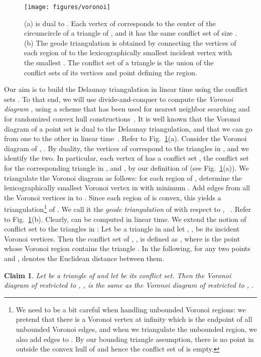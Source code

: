 \documentclass{siamltex}
\newtheorem{claim}[theorem]{Claim}
\begin{document}
\begin{figure}
\begin{center}
\texttt{[image: figures/voronoi]}
\end{center}
\caption{(a)  is dual to . Each vertex  of  
corresponds to the center of the circumcircle of a triangle  of ,
and it has the same conflict set  of size . 
(b) The geode triangulation
 is obtained by connecting the vertices of each region of  to
the lexicographically smallest incident vertex with the smallest . 
The conflict set of
a triangle  is the union of the conflict sets of its vertices and
point  defining the region.} \label{fig:vor}
\end{figure}
Our aim is to build the Delaunay triangulation
 in linear time using the conflict sets . To that end,
we will use divide-and-conquer to compute the \emph{Voronoi diagram}
,
using a scheme that has been used for nearest neighbor searching \cite{C88}
and for randomized convex hull constructions~\cite{CS89,Chazelle00}.
It is well
known that the Voronoi diagram of a point set is dual to the Delaunay 
triangulation,
and that we can go from one to the other in linear 
time~\cite[Chapter~9]{deBergKrOvSc00}.
Refer to Fig.~\ref{fig:vor}(a).
Consider the Voronoi diagram of , .
By duality, the vertices of  correspond to the triangles
in , and we identify the two. In particular, each vertex  of 
 has a conflict set , the conflict set for the 
corresponding triangle in , and , by our definition 
of  (see Fig.~\ref{fig:vor}(a)).
We triangulate the Voronoi diagram as follows: for each region  of
, determine the lexicographically smallest Voronoi vertex 
 in  with minimum . Add edges from  all the Voronoi vertices 
in  to . Since each region of  is convex, this 
yields a triangulation\footnote{We need to be a bit careful when handling 
unbounded 
Voronoi regions:
we pretend that there is a Voronoi vertex  at infinity which is the 
endpoint of all unbounded Voronoi edges, and when we triangulate the 
unbounded region, we also add
edges to . By our bounding triangle assumption, there is no point in 
 outside the convex hull of  and hence the conflict set 
of  is empty.} of . We call it the 
\emph{geode triangulation} of  with respect to , 
~\cite{C88,Chazelle00}. Refer to Fig.~\ref{fig:vor}(b).
Clearly,  can be computed in linear time. 
We extend the notion of conflict set to the triangles
in : Let  be a triangle in  and let , ,  be
its incident Voronoi vertices. Then the conflict set of , , 
is defined as 
, 
where  is the
point whose Voronoi region contains the triangle .
In the following, for any two points  and ,
 denotes the Euclidean distance between them.
\medskip
\begin{claim}\label{clm:VDVX}
Let  be a triangle of  and let  be its conflict set. Then the
Voronoi diagram of  restricted to , 
,
is the same as the Voronoi diagram of  restricted to , 
.
\end{claim}
\end{document}
